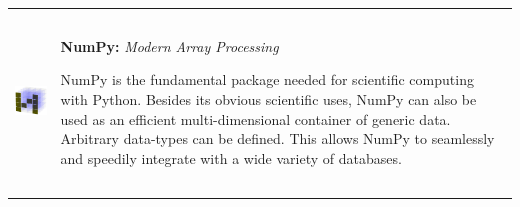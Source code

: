     \begin{center}
    \begin{tabularx}{\textwidth}{rX}
        \begin{minipage}{0.25\columnwidth}
            \begin{center}
            \includegraphics[height=4cm]{./images/numpy_logo.png}
            \end{center}
        \end{minipage}
        &
        \begin{minipage}{0.7\columnwidth}
            \textbf{NumPy:} \textit{Modern Array Processing}
            \vspace{0.5ex}

            \footnotesize{NumPy is the fundamental package needed for scientific
                computing with Python. Besides its obvious scientific uses, NumPy
                can also be used as an efficient multi-dimensional container of generic
                data. Arbitrary data-types can be defined. This allows NumPy to seamlessly
                and speedily integrate with a wide variety of databases.}
        \end{minipage}
    \end{tabularx}
    \end{center}

\columnbreak



